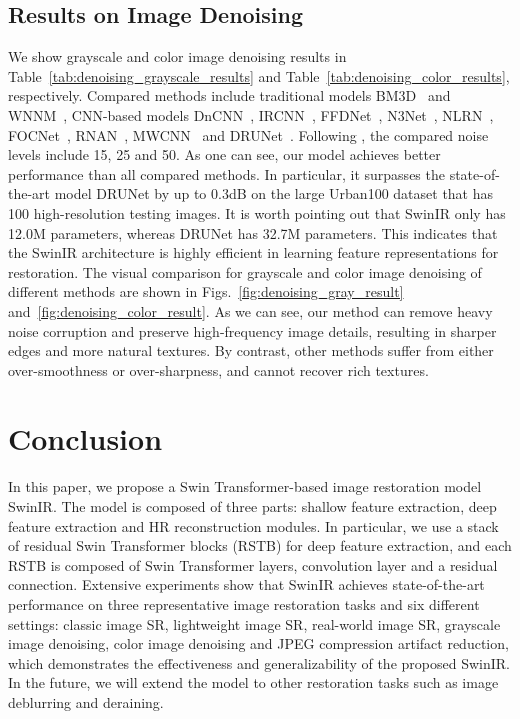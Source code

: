 \documentclass[10pt,twocolumn,letterpaper]{article}
\newlength \g
\begin{document}
\subsection{Results on Image Denoising}
We show grayscale and color image denoising results in Table~\ref{tab:denoising_grayscale_results} and Table~\ref{tab:denoising_color_results}, respectively. Compared methods include traditional models BM3D~\cite{dabov2007bm3d} and WNNM~\cite{gu2014weighted}, CNN-based models DnCNN~\cite{zhang2017DnCNN}, IRCNN~\cite{zhang2017IRCNN}, FFDNet~\cite{zhang2018ffdnet}, N3Net~\cite{plotz2018N3Net}, NLRN~\cite{liu2018NLRN}, FOCNet~\cite{jia2019focnet}, RNAN~\cite{zhang2019RNAN}, MWCNN~\cite{liu2018MWCNN} and DRUNet~\cite{zhang2021DPIR}. Following \cite{zhang2017DnCNN, zhang2021DPIR}, the compared noise levels include 15, 25 and 50. As one can see, our model achieves better performance than all compared methods. In particular, it surpasses the state-of-the-art model DRUNet by up to 0.3dB on the large Urban100 dataset that has 100 high-resolution testing images. 
It is worth pointing out that SwinIR only has 12.0M parameters, whereas DRUNet has 32.7M parameters. This indicates that the SwinIR architecture is highly efficient in learning feature representations for restoration. The visual comparison for grayscale and color image denoising of different methods are shown in Figs.~\ref{fig:denoising_gray_result} and~\ref{fig:denoising_color_result}. As we can see, our method can remove heavy noise corruption and preserve high-frequency image details, resulting in sharper edges and more natural textures. By contrast, other methods suffer from either over-smoothness or over-sharpness, and cannot recover rich textures. 
















\section{Conclusion}
In this paper, we propose a Swin Transformer-based image restoration model SwinIR. The model is composed of three parts: shallow feature extraction, deep feature extraction and HR reconstruction modules. In particular, we use a stack of residual Swin Transformer blocks (RSTB) for deep feature extraction, and each RSTB is composed of Swin Transformer layers, convolution layer and a residual connection. Extensive experiments show that SwinIR achieves state-of-the-art performance on three representative image restoration tasks and six different settings: classic image SR, lightweight image SR, real-world image SR, grayscale image denoising, color image denoising and JPEG compression artifact reduction, which demonstrates the effectiveness and generalizability of the proposed SwinIR. In the future, we will extend the model to other restoration tasks such as image deblurring and deraining.
\end{document}
